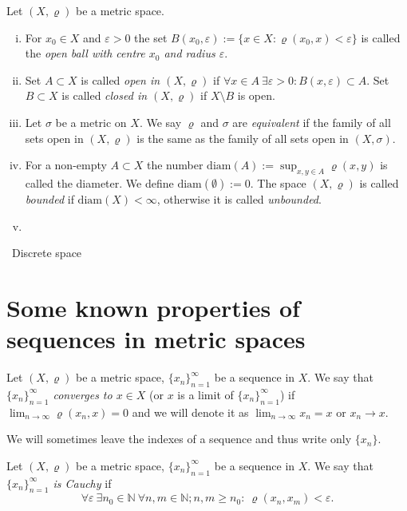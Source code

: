 \begin{define}\label{def:allprp}
Let $(X,\varrho)$ be a metric space.

\begin{enumerate}[(i)]
	\item For $x_0\in X$ and $\varepsilon > 0$ the set $B(x_0,\varepsilon):=\{x\in X : \varrho(x_0,x)<\varepsilon\}$ is called the \emph{open ball with centre $x_0$ and radius $\varepsilon$}.
	\item Set $A\subset X$ is called \emph{open in $(X,\varrho)$} if $\forall x\in A\ \exists \varepsilon>0: B(x,\varepsilon)\subset A$. Set $B\subset X$ is called \emph{closed in $(X,\varrho)$} if $X\setminus B$ is open.
	\item Let $\sigma$ be a metric on $X$. We say $\varrho$ and $\sigma$ are \emph{equivalent} if the family of all sets open in $(X,\varrho)$ is the same as the family of all sets open in $(X,\sigma)$.
	\item For a non-empty $A\subset X$ the number $\mathrm{diam}(A):=\sup_{x,y\in A}\varrho(x,y)$ is called the diameter. We define $\mathrm{diam}(\emptyset):=0$. The space $(X,\varrho)$ is called \emph{bounded} if $\mathrm{diam}(X)<\infty$, otherwise it is called \emph{unbounded}.
	\item
\end{enumerate}
\end{define}


\begin{example}
	\tbd\ Discrete space
\end{example}

\section{Some known properties of sequences in metric spaces}

\begin{define}\label{def:consq}
Let $(X,\varrho)$ be a metric space, $\{x_n\}_{n=1}^\infty$ be a sequence in $X$. We say that \emph{$\{x_n\}_{n=1}^\infty$ converges to $x\in X$} (or $x$ is a limit of $\{x_n\}_{n=1}^\infty$) if $\lim_{n\to\infty}\varrho(x_n,x)=0$ and we will denote it as $\lim_{n\to\infty}x_n=x$ or $x_n\to x$.
\end{define}

We will sometimes leave the indexes of a sequence and thus write only $\{x_n\}$.

\begin{define}\label{def:causq}
Let $(X,\varrho)$ be a metric space, $\{x_n\}_{n=1}^\infty$ be a sequence in $X$. We say that \emph{$\{x_n\}_{n=1}^\infty$ is Cauchy} if
\[
	\forall \varepsilon\ \exists n_0\in \mathbb{N} \ \forall n,m \in \mathbb{N}; n,m\ge n_0:\ \varrho(x_n,x_m)<\varepsilon.
\]
\end{define}

